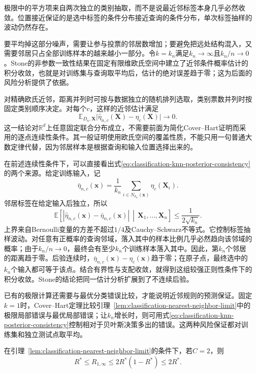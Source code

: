 极限中的平方项来自两次独立的类别抽取，而不是说最近邻标签本身几乎必然收敛。位置接近保证的是选中标签的条件分布接近查询的条件分布，单次标签抽样的波动仍然存在。

要平均掉这部分噪声，需要让参与投票的邻居数增加；要避免把远处结构混入，又需要邻居只占全部训练样本的越来越小一部分。令$k=k_n$满足$k_n\to\infty$且$k_n/n\to0$。Stone的非参数一致性结果在固定有限维欧氏空间中建立了近邻条件概率估计的积分收敛，也就是对训练集与查询取平均后，估计的绝对误差趋于零；这为后面的风险分析提供了依据。

对精确欧氏近邻，距离并列时可按与数据独立的随机排列选取，类别票数并列时按固定类别顺序决定。对每个$c$，这样的近邻估计满足
\begin{equation}
  \mathbb{E}_{D_n,\bm{X}}
  \bigl|\hat\eta_{n,c}(\bm{X})-\eta_c(\bm{X})\bigr|
  \longrightarrow0.
  \label{eq:classification-knn-posterior-consistency}
\end{equation}
这一结论对$\mathbb{R}^d$上任意固定联合分布成立，不需要前面为简化Cover--Hart证明而采用的逐点连续性条件。其一般证明使用欧氏空间的覆盖性质，不能只用一句普通大数定律代替，因为邻居样本是根据查询和输入位置选择出来的。

在前述连续性条件下，可以直接看出式\eqref{eq:classification-knn-posterior-consistency}的两个来源。给定训练输入，记
\[
  \bar\eta_{n,c}(\bm{x})
  =\frac{1}{k_n}\sum_{i\in N_{k_n}(\bm{x})}\eta_c(\bm{X}_i).
\]
邻居标签在给定输入后独立，所以
\[
  \mathbb{E}\!\left[
    |\hat\eta_{n,c}(\bm{x})-\bar\eta_{n,c}(\bm{x})|
    \,\middle|\,\bm{X}_1,\ldots,\bm{X}_n
  \right]\leq\frac{1}{2\sqrt{k_n}}.
\]
上界来自Bernoulli变量的方差不超过$1/4$及Cauchy--Schwarz不等式。它控制标签抽样波动。对任意有正概率的查询邻域，落入其中的样本比例几乎必然趋向该邻域的概率；由于$k_n/n\to0$，最终会有至少$k_n$个训练样本落入其中。因此，第$k_n$个邻居的距离趋于零。后验连续时，$\bar\eta_{n,c}(\bm{x})-\eta_c(\bm{x})$趋于零；在原子点，最终选中的$k_n$个输入都可等于该点。结合有界性与支配收敛，就得到这组较强正则性条件下的积分收敛。Stone的结论把同一估计分析扩展到了不连续后验。

已有的极限计算还需要与最优分类错误比较，才能说明近邻规则的预测保证。固定$k=1$时，Cover--Hart定理比较引理~\ref{lem:classification-nearest-neighbor-limit}中的极限局部错误与最优局部错误；让$k_n$增长时，则可用式\eqref{eq:classification-knn-posterior-consistency}控制相对于贝叶斯决策多出的错误。这两种风险保证都对训练集和独立测试点取平均。

\begin{theorem}
  \label{thm:classification-cover-hart-binary}
  在引理~\ref{lem:classification-nearest-neighbor-limit}的条件下，若$C=2$，则
  \begin{equation}
    R^\ast\leq R_{1,\infty}
    \leq2R^\ast(1-R^\ast)\leq2R^\ast.
    \label{eq:classification-cover-hart-binary}
  \end{equation}
\end{theorem}

